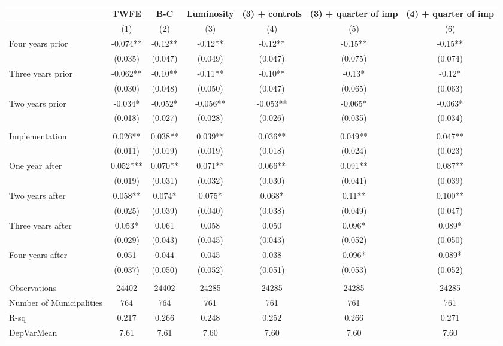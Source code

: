 \begin{tabular}{lcccccc}
\toprule
      & TWFE  & B-C   & Luminosity & (3) + controls & (3) + quarter of imp & (4) + quarter of imp \\
\midrule
      & (1)   & (2)   & (3)   & (4)   & (5)   & (6) \\
\midrule
\midrule
Four years prior & -0.074** & -0.12** & -0.12** & -0.12** & -0.15** & -0.15** \\
      & (0.035) & (0.047) & (0.049) & (0.047) & (0.075) & (0.074) \\
Three years prior & -0.062** & -0.10** & -0.11** & -0.10** & -0.13* & -0.12* \\
      & (0.030) & (0.048) & (0.050) & (0.047) & (0.065) & (0.063) \\
Two years prior & -0.034* & -0.052* & -0.056** & -0.053** & -0.065* & -0.063* \\
      & (0.018) & (0.027) & (0.028) & (0.026) & (0.035) & (0.034) \\
      &       &       &       &       &       &  \\
Implementation & 0.026** & 0.038** & 0.039** & 0.036** & 0.049** & 0.047** \\
      & (0.011) & (0.019) & (0.019) & (0.018) & (0.024) & (0.023) \\
One year after & 0.052*** & 0.070** & 0.071** & 0.066** & 0.091** & 0.087** \\
      & (0.019) & (0.031) & (0.032) & (0.030) & (0.041) & (0.039) \\
Two years after & 0.058** & 0.074* & 0.075* & 0.068* & 0.11** & 0.100** \\
      & (0.025) & (0.039) & (0.040) & (0.038) & (0.049) & (0.047) \\
Three years after & 0.053* & 0.061 & 0.058 & 0.050 & 0.096* & 0.089* \\
      & (0.029) & (0.043) & (0.045) & (0.043) & (0.052) & (0.050) \\
Four years after & 0.051 & 0.044 & 0.045 & 0.038 & 0.096* & 0.089* \\
      & (0.037) & (0.050) & (0.052) & (0.051) & (0.053) & (0.052) \\
      &       &       &       &       &       &  \\
\midrule
Observations & 24402 & 24402 & 24285 & 24285 & 24285 & 24285 \\
Number of Municipalities & 764   & 764   & 761   & 761   & 761   & 761 \\
R-sq  & 0.217 & 0.266 & 0.248 & 0.252 & 0.266 & 0.271 \\
DepVarMean & 7.61  & 7.61  & 7.60  & 7.60  & 7.60  & 7.60 \\
\bottomrule
\bottomrule
\end{tabular}%
